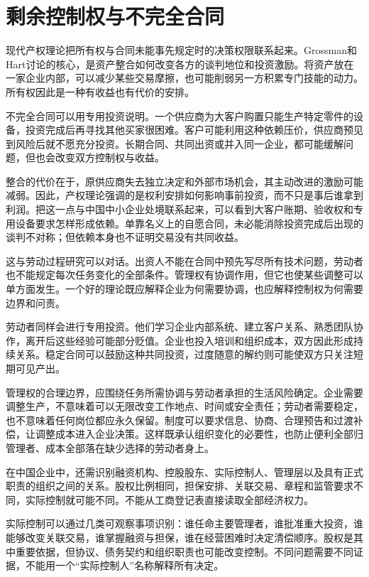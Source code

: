 \documentclass[UTF8,fontset=fandol,zihao=-4,oneside,openany]{ctexbook}
\begin{document}
\section{剩余控制权与不完全合同}
现代产权理论把所有权与合同未能事先规定时的决策权限联系起来。Grossman和Hart讨论的核心，是资产整合如何改变各方的谈判地位和投资激励。将资产放在一家企业内部，可以减少某些交易摩擦，也可能削弱另一方积累专门技能的动力。所有权因此是一种有收益也有代价的安排。\cite{Grossman1986}

\label{arg:P079}
不完全合同可以用专用投资说明。一个供应商为大客户购置只能生产特定零件的设备，投资完成后再寻找其他买家很困难。客户可能利用这种依赖压价，供应商预见到风险后就不愿充分投资。长期合同、共同出资或并入同一企业，都可能缓解问题，但也会改变双方控制权与收益。

整合的代价在于，原供应商失去独立决定和外部市场机会，其主动改进的激励可能减弱。因此，产权理论强调的是权利安排如何影响事前投资，而不只是事后谁拿到利润。把这一点与中国中小企业处境联系起来，可以看到大客户账期、验收权和专用设备要求怎样形成依赖。单靠名义上的自愿合同，未必能消除投资完成后出现的谈判不对称；但依赖本身也不证明交易没有共同收益。

这与劳动过程研究可以对话。出资人不能在合同中预先写尽所有技术问题，劳动者也不能规定每次任务变化的全部条件。管理权有协调作用，但它也使某些调整可以单方面发生。一个好的理论既应解释企业为何需要协调，也应解释控制权为何需要边界和问责。

\label{arg:P080}
劳动者同样会进行专用投资。他们学习企业内部系统、建立客户关系、熟悉团队协作，离开后这些经验可能部分贬值。企业也投入培训和组织成本，双方因此形成持续关系。稳定合同可以鼓励这种共同投资，过度随意的解约则可能使双方只关注短期可见产出。

管理权的合理边界，应围绕任务所需协调与劳动者承担的生活风险确定。企业需要调整生产，不意味着可以无限改变工作地点、时间或安全责任；劳动者需要稳定，也不意味着任何岗位都应永久保留。制度可以要求信息、协商、合理预告和过渡补偿，让调整成本进入企业决策。这样既承认组织变化的必要性，也防止便利全部归管理者、成本全部落在缺少选择的劳动者身上。

在中国企业中，还需识别融资机构、控股股东、实际控制人、管理层以及具有正式职责的组织之间的关系。股权比例相同，担保安排、关联交易、章程和监管要求不同，实际控制就可能不同。不能从工商登记表直接读取全部经济权力。

\label{arg:P081}
实际控制可以通过几类可观察事项识别：谁任命主要管理者，谁批准重大投资，谁能够改变关联交易，谁掌握融资与担保，谁在经营困难时决定清偿顺序。股权是其中重要依据，但协议、债务契约和组织职责也可能改变控制。不同问题需要不同证据，不能用一个“实际控制人”名称解释所有决定。
\end{document}
